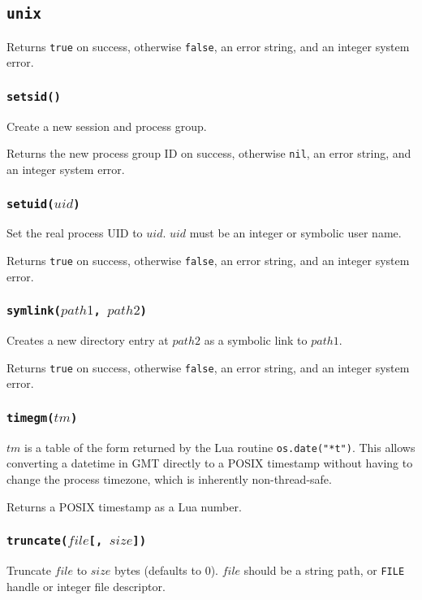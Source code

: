 \documentclass[11pt, oneside]{memoir}
\newcommand*{\true}[0]{\texttt{true}\xspace}
\newcommand*{\false}[0]{\texttt{false}\xspace}
\newcommand*{\nil}[0]{\texttt{nil}\xspace}
\newcommand*{\fn}[1]{\texttt{#1}\xspace}
\newcommand*{\const}[1]{\texttt{#1}\xspace}
\newcounter{toccols}
\newenvironment{Module}[1]{
	\subsection{\texttt{#1}}
	\addtocontents{toc}{
		\protect\begin{multicols}{\value{toccols}}
	}
}{
	\addtocontents{toc}{\protect\end{multicols}}
}
\begin{document}
\begin{Module}{unix}
Returns \true on success, otherwise \false, an error string, and an integer system error.

\subsubsection[\fn{setsid}]{\fn{setsid()}}

Create a new session and process group.

Returns the new process group ID on success, otherwise \nil, an error string, and an integer system error.

\subsubsection[\fn{setuid}]{\fn{setuid($uid$)}}

Set the real process UID to $uid$. $uid$ must be an integer or symbolic user name.

Returns \true on success, otherwise \false, an error string, and an integer system error.

\subsubsection[\fn{symlink}]{\fn{symlink($path1$, $path2$)}}

Creates a new directory entry at $path2$ as a symbolic link to $path1$.

Returns \true on success, otherwise \false, an error string, and an integer system error. 

\subsubsection[\fn{timegm}]{\fn{timegm($tm$)}}

$tm$ is a table of the form returned by the Lua routine \fn{os.date("*t")}. This allows converting a datetime in GMT directly to a POSIX timestamp without having to change the process timezone, which is inherently non-thread-safe.

Returns a POSIX timestamp as a Lua number.

\subsubsection[\fn{truncate}]{\fn{truncate($file$[, $size$])}}

Truncate $file$ to $size$ bytes (defaults to 0). $file$ should be a string path, or \const{FILE} handle or integer file descriptor.


\end{Module}
\end{document}
